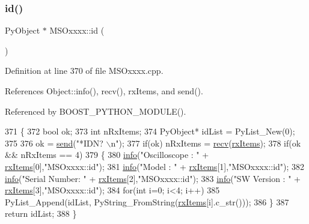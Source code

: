 \subsubsection{\texorpdfstring{id()}{id()}}
{\footnotesize\ttfamily Py\+Object $\ast$ M\+S\+Oxxxx\+::id (\begin{DoxyParamCaption}{ }\end{DoxyParamCaption})}



Definition at line 370 of file M\+S\+Oxxxx.\+cpp.



References Object\+::info(), recv(), rx\+Items, and send().



Referenced by B\+O\+O\+S\+T\+\_\+\+P\+Y\+T\+H\+O\+N\+\_\+\+M\+O\+D\+U\+L\+E().


\begin{DoxyCode}
371 \{   
372     \textcolor{keywordtype}{bool} ok;
373     \textcolor{keywordtype}{int} nRxItems;
374     PyObject* idList = PyList\_New(0);
375     
376     ok = \hyperlink{classMSOxxxx_ae77668a1ae4ccb74e0ed5f2485dfdebf}{send}(\textcolor{stringliteral}{"*IDN? \(\backslash\)n"});
377     \textcolor{keywordflow}{if}(ok)  nRxItems = \hyperlink{classMSOxxxx_aa02e46a61e287ef1f5377e9e42399faf}{recv}(\hyperlink{classMSOxxxx_a847cae37181e9ec5f481edcc3fb19b1a}{rxItems});
378     \textcolor{keywordflow}{if}(ok && nRxItems == 4)
379     \{
380         \hyperlink{classObject_a644fd329ea4cb85f54fa6846484b84a8}{info}(\textcolor{stringliteral}{"Oscilloscope : "} + \hyperlink{classMSOxxxx_a847cae37181e9ec5f481edcc3fb19b1a}{rxItems}[0],\textcolor{stringliteral}{"MSOxxxx::id"});
381         \hyperlink{classObject_a644fd329ea4cb85f54fa6846484b84a8}{info}(\textcolor{stringliteral}{"Model        : "} + \hyperlink{classMSOxxxx_a847cae37181e9ec5f481edcc3fb19b1a}{rxItems}[1],\textcolor{stringliteral}{"MSOxxxx::id"});
382         \hyperlink{classObject_a644fd329ea4cb85f54fa6846484b84a8}{info}(\textcolor{stringliteral}{"Serial Number: "} + \hyperlink{classMSOxxxx_a847cae37181e9ec5f481edcc3fb19b1a}{rxItems}[2],\textcolor{stringliteral}{"MSOxxxx::id"});
383         \hyperlink{classObject_a644fd329ea4cb85f54fa6846484b84a8}{info}(\textcolor{stringliteral}{"SW Version   : "} + \hyperlink{classMSOxxxx_a847cae37181e9ec5f481edcc3fb19b1a}{rxItems}[3],\textcolor{stringliteral}{"MSOxxxx::id"});
384         \textcolor{keywordflow}{for}(\textcolor{keywordtype}{int} i=0; i<4; i++)
385             PyList\_Append(idList, PyString\_FromString(\hyperlink{classMSOxxxx_a847cae37181e9ec5f481edcc3fb19b1a}{rxItems}[i].c\_str()));
386     \}
387     \textcolor{keywordflow}{return} idList;
388 \}
\end{DoxyCode}
\mbox{\label{classObject_a644fd329ea4cb85f54fa6846484b84a8}} 
